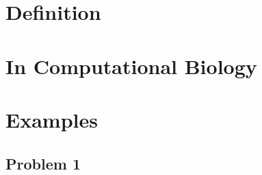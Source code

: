 \section{Definition} 

\section{In Computational Biology}

\section{Examples}
\subsection{Problem 1}